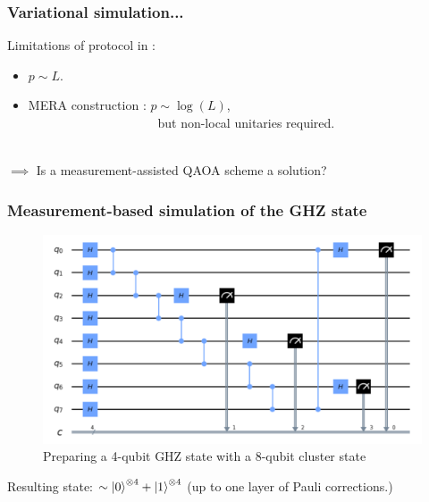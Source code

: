 \documentclass{beamer}
\theoremstyle{definition}
\begin{document}

\begin{frame}
\frametitle{Variational simulation...}


Limitations of protocol in \cite{VQCS}: 
\begin{itemize}
	
	
	\item  $p \sim L$.
	
	\item MERA construction \cite{MERA}: $p\sim \log(L)$, \\
	$\quad\quad\quad\quad\quad\quad\qquad\qquad$ but non-local unitaries required.
\end{itemize}

$\,$\\


$\implies$ Is a measurement-assisted QAOA scheme a solution?






\end{frame}


\begin{frame}


\frametitle{Measurement-based simulation of the GHZ state}


\begin{figure}[!htb]
	\centering
	\includegraphics[scale=0.45]{GHZ_4}
	\caption{Preparing a 4-qubit GHZ state with a 8-qubit cluster state}
\end{figure}
Resulting state: $\sim \left\vert{0}\right\rangle^{\otimes 4} + \left\vert{1}\right\rangle^{\otimes 4}$ (up to one layer of Pauli corrections.)




\end{frame}
\end{document}
